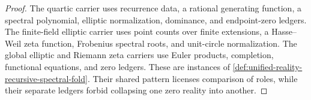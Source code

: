 \begin{proof}
The quartic carrier uses recurrence data, a rational generating
function, a spectral polynomial, elliptic normalization, dominance, and
endpoint-zero ledgers.  The finite-field elliptic carrier uses point
counts over finite extensions, a Hasse--Weil zeta function, Frobenius
spectral roots, and unit-circle normalization.  The global elliptic and
Riemann zeta carriers use Euler products, completion, functional
equations, and zero ledgers.  These are instances of
\autoref{def:unified-reality-recursive-spectral-fold}.  Their shared
pattern licenses comparison of roles, while their separate ledgers
forbid collapsing one zero reality into another.
\end{proof}

